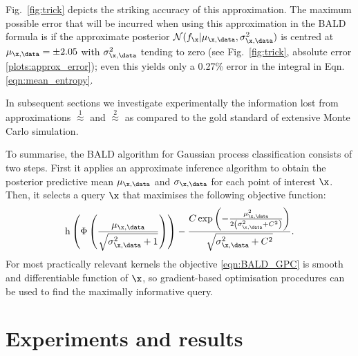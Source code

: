 Fig.\ \ref{fig:trick} depicts the striking accuracy of this approximation. The maximum possible error that will be incurred when using this approximation in the BALD formula is if the approximate posterior $\mathcal{N}(f_{\x}\vert \mu_{\x,\data},\sigma_{\x,\data}^2)$ is centred at $\mu_{\x,\data}=\pm 2.05$  with $\sigma_{\x,\data}^2$ tending to zero (see Fig.\ \ref{fig:trick}, absolute error \ref{plots:approx_error}); even this yields only a 0.27\% error in the integral in Eqn.\eqref{eqn:mean_entropy}.

In subsequent sections we investigate experimentally the information lost from approximations {\scriptsize $\stackrel{1}{\approx}$} and {\scriptsize $\stackrel{2}{\approx}$} as compared to the gold standard of extensive Monte Carlo simulation.

To summarise, the BALD algorithm for Gaussian process classification consists of two steps. First it applies an approximate inference algorithm to obtain the posterior predictive mean $\mu_{\x,\data}$ and $\sigma_{\x,\data}$ for each point of interest $\x$. Then, it selects a query $\x$ that maximises the following objective function:
%
\begin{equation}
	\mathrm{h} \left( \Phi\left( \frac{\mu_{\x,\data}}{\sqrt{\sigma^2_{\x,\data} + 1}} \right)\right) - \frac{C \exp\left(-\frac{\mu_{\x,\data}^2}{2\left(\sigma_{\x,\data}^2 + C^2\right)}\right)}{\sqrt{\sigma_{\x,\data}^2 + C^2}}. \label{eqn:BALD_GPC}
\end{equation}
%
For most practically relevant kernels the objective \eqref{eqn:BALD_GPC} is smooth and differentiable function of $\x$, so gradient-based optimisation procedures can be used to find the maximally informative query.
	

\section{Experiments and results}

